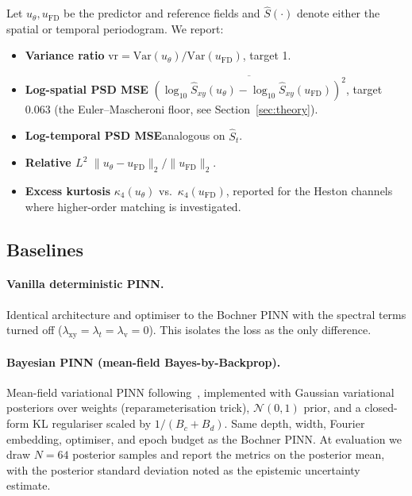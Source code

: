\documentclass[10pt]{elsarticle}
\begin{document}
Let \(u_\theta, u_{\mathrm{FD}}\) be the predictor and reference
fields and \(\widehat S(\cdot)\) denote either the spatial or
temporal periodogram. We report:
\begin{itemize}
\item \textbf{Variance ratio}\quad
\(\mathrm{vr} = \mathrm{Var}(u_\theta)/\mathrm{Var}(u_{\mathrm{FD}})\),
target 1.
\item \textbf{Log-spatial PSD MSE}\quad
\(\overline{(\log_{10}\widehat S_{xy}(u_\theta) -
\log_{10}\widehat S_{xy}(u_{\mathrm{FD}}))^2}\), target 0.063
(the Euler--Mascheroni floor, see Section~\ref{sec:theory}).
\item \textbf{Log-temporal PSD MSE}\quad analogous on
\(\widehat S_t\).
\item \textbf{Relative \(L^2\)}\quad
\(\|u_\theta - u_{\mathrm{FD}}\|_2 / \|u_{\mathrm{FD}}\|_2\).
\item \textbf{Excess kurtosis}\quad
\(\kappa_4(u_\theta)\) vs.\ \(\kappa_4(u_{\mathrm{FD}})\), reported
for the Heston channels where higher-order matching is investigated.
\end{itemize}

\subsection{Baselines}

\paragraph{Vanilla deterministic PINN.} Identical architecture and
optimiser to the Bochner PINN with the spectral terms turned off
(\(\lambda_{\mathrm{xy}} = \lambda_t = \lambda_{\mathrm v} = 0\)).
This isolates the loss as the only difference.

\paragraph{Bayesian PINN (mean-field Bayes-by-Backprop).}
Mean-field variational PINN following~\cite{YangMengKarniadakis2021},
implemented with Gaussian variational posteriors over weights
(reparameterisation trick), \(\mathcal N(0, 1)\) prior, and a
closed-form KL regulariser scaled by \(1/(B_c + B_d)\). Same
depth, width, Fourier embedding, optimiser, and epoch budget as
the Bochner PINN. At evaluation we draw \(N = 64\) posterior
samples and report the metrics on the posterior mean, with the
posterior standard deviation noted as the epistemic uncertainty
estimate.
\end{document}

